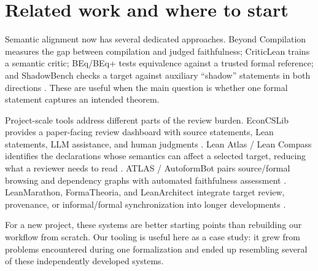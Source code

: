 \section{Related work and where to start}
\label{sec:related}

Semantic alignment now has several dedicated approaches.  Beyond Compilation
measures the gap between compilation and judged faithfulness; CriticLean trains
a semantic critic; BEq/BEq+ tests equivalence against a trusted formal
reference; and ShadowBench checks a target against auxiliary ``shadow''
statements in both directions
\citep{zhang2026beyondcompilation,peng2025criticlean,liu2025beq,poiroux2025reliable,han2026shadowbench}.
These are useful when the main question is whether one formal statement captures
an intended theorem.

Project-scale tools address different parts of the review burden.  EconCSLib
provides a paper-facing review dashboard with source statements, Lean statements,
LLM assistance, and human judgments \citep{garg2026econcs}.  Lean Atlas / Lean
Compass identifies the declarations whose semantics can affect a selected target,
reducing what a reviewer needs to read \citep{yanahama2026leanatlas}.
ATLAS / AutoformBot pairs source/formal browsing and dependency graphs with
automated faithfulness assessment \citep{rammal2026scale}.  LeanMarathon,
FormaTheoria, and LeanArchitect integrate target review, provenance, or
informal/formal synchronization into longer developments
\citep{zhang2026leanmarathon,nie2026formatheoria,zhu2026leanarchitect}.

For a new project, these systems are better starting points than rebuilding our
workflow from scratch.  Our tooling is useful here as a case study: it grew from
problems encountered during one formalization and ended up resembling several of
these independently developed systems.
